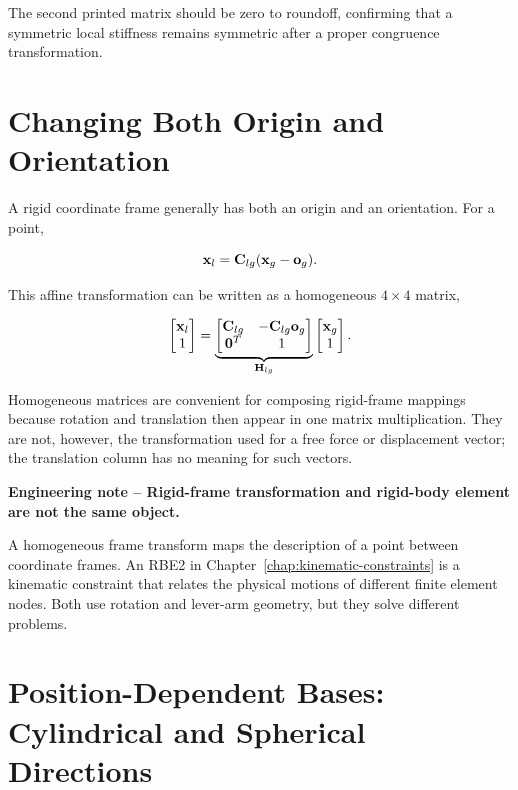The second printed matrix should be zero to roundoff, confirming that a symmetric
local stiffness remains symmetric after a proper congruence transformation.

\section{Changing Both Origin and Orientation}

A rigid coordinate frame generally has both an origin and an orientation. For a
point,

\begin{equation}
    \mathbf{x}_l=\mathbf{C}_{lg}(\mathbf{x}_g-\mathbf{o}_g).
\end{equation}

This affine transformation can be written as a homogeneous $4\times4$ matrix,

\begin{equation}
\begin{bmatrix}
\mathbf{x}_l\\1
\end{bmatrix}
=
\underbrace{
\begin{bmatrix}
\mathbf{C}_{lg}&-\mathbf{C}_{lg}\mathbf{o}_g\\
\mathbf{0}^T&1
\end{bmatrix}}_{\mathbf{H}_{lg}}
\begin{bmatrix}
\mathbf{x}_g\\1
\end{bmatrix}.
\end{equation}

Homogeneous matrices are convenient for composing rigid-frame mappings because
rotation and translation then appear in one matrix multiplication. They are not,
however, the transformation used for a free force or displacement vector; the
translation column has no meaning for such vectors.

\begin{bbox}
\textbf{Engineering note -- Rigid-frame transformation and rigid-body element are
not the same object.}

A homogeneous frame transform maps the description of a point between coordinate
frames. An RBE2 in Chapter~\ref{chap:kinematic-constraints} is a kinematic
constraint that relates the physical motions of different finite element nodes.
Both use rotation and lever-arm geometry, but they solve different problems.
\end{bbox}

\section[Position-Dependent Bases]{Position-Dependent Bases: Cylindrical and Spherical Directions}

